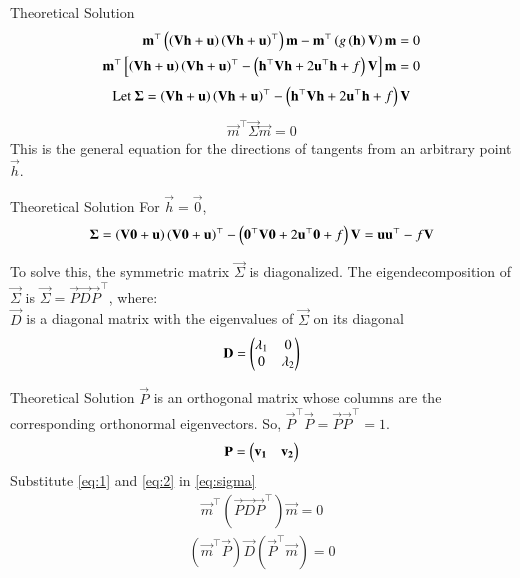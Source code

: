 \documentclass{beamer}
\begin{document}
\begin{frame}{Theoretical Solution}
\begin{align}
    \mathbf{m}^\top \left(\left(\mathbf{V}\mathbf{h} + \mathbf{u}\right)\left(\mathbf{V}\mathbf{h} + \mathbf{u}\right)^\top\right) \mathbf{m} - \mathbf{m}^\top \left(g\left(\mathbf{h}\right)\mathbf{V}\right) \mathbf{m} &= 0 \\
    \mathbf{m}^\top {}\left[\left(\mathbf{V}\mathbf{h} + \mathbf{u}\right)\left(\mathbf{V}\mathbf{h} + \mathbf{u}\right)^\top - \left(\mathbf{h}^\top\mathbf{V}\mathbf{h} + 2\mathbf{u}^\top\mathbf{h} + f\right)\mathbf{V}\right] \mathbf{m} &= 0
\end{align}
\begin{align}
    \text{Let }\mathbf{\Sigma} = \left(\mathbf{V}\mathbf{h} + \mathbf{u}\right)\left(\mathbf{V}\mathbf{h} + \mathbf{u}\right)^\top - \left(\mathbf{h}^\top\mathbf{V}\mathbf{h} + 2\mathbf{u}^\top\mathbf{h} + f\right)\mathbf{V} \label{eq:sigma_notation}
\end{align}
\begin{align}
    \vec{m}^\top \vec{\Sigma} \vec{m} = 0 \label{eq:sigma}
\end{align}
This is the general equation for the directions of tangents from an arbitrary point $\vec{h}$.
\end{frame}

\begin{frame}{Theoretical Solution}
For $\vec{h} = \vec{0}$,
\begin{align}
    \mathbf{\Sigma} = \left(\mathbf{V}\mathbf{0} + \mathbf{u}\right)\left(\mathbf{V}\mathbf{0} + \mathbf{u}\right)^\top - \left(\mathbf{0}^\top\mathbf{V}\mathbf{0} + 2\mathbf{u}^\top\mathbf{0} + f\right)\mathbf{V} = \mathbf{u}\mathbf{u}^\top - f\mathbf{V}
\end{align}

To solve this, the symmetric matrix $\vec{\Sigma}$ is diagonalized. The eigendecomposition of $\vec{\Sigma}$ is $\vec{\Sigma} = \vec{P}\vec{D}\vec{P}^\top$, where: \\
$\vec{D}$ is a diagonal matrix with the eigenvalues of $\vec{\Sigma}$ on its diagonal
\begin{align}
    \mathbf{D} = \begin{pmatrix}\lambda_1 & 0 \\ 0 & \lambda_2\end{pmatrix} \label{eq:1}
\end{align}
\end{frame}

\begin{frame}{Theoretical Solution}
    $\vec{P}$ is an orthogonal matrix whose columns are the corresponding orthonormal eigenvectors. So, $\vec{P}^\top \vec{P} = \vec{P}\vec{P}^\top = 1$.
\begin{align}
    \mathbf{P} = \begin{pmatrix}\mathbf{v_1} & \mathbf{v_2}\end{pmatrix} \label{eq:2}
\end{align}
Substitute \eqref{eq:1} and \eqref{eq:2} in \eqref{eq:sigma}
\begin{align}
    \vec{m}^\top (\vec{P}\vec{D}\vec{P}^\top) \vec{m} = 0
\end{align}
\begin{align}
    (\vec{m}^\top \vec{P})\vec{D}(\vec{P}^\top \vec{m}) = 0
\end{align}
\end{frame}
\end{document}
